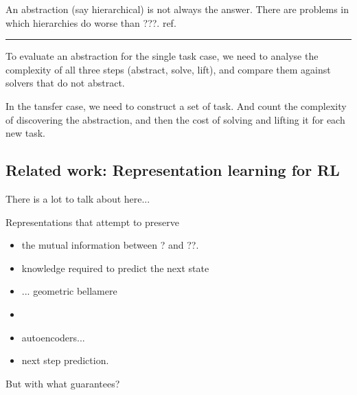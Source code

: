 An abstraction (say hierarchical) is not always the answer. There are problems in which
hierarchies do worse than ???. ref.

\begin{center}\rule{0.5\linewidth}{\linethickness}\end{center}

To evaluate an abstraction for the single task case, we need to analyse the
complexity of all three steps (abstract, solve, lift), and compare them against
solvers that do not abstract.

In the tansfer case, we need to construct a set of task. And count the
complexity of discovering the abstraction, and then the cost of solving
and lifting it for each new task.

\subsection{Related work: Representation learning for RL}


{\color{red}There is a lot to talk about here...}

Representations that attempt to preserve
\begin{itemize}
\tightlist
  \item the mutual information between ? and ??.
  \item knowledge required to predict the next state
  \item ... geometric bellamere
  \item \cite{Nachum2018}
  \item autoencoders...
  \item next step prediction.
\end{itemize}

But with what guarantees?
